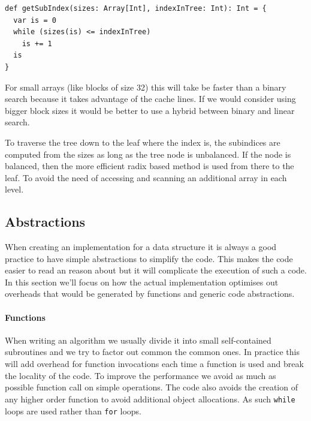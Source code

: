 \begin{lstlisting}[frame=single]
def getSubIndex(sizes: Array[Int], indexInTree: Int): Int = {
  var is = 0
  while (sizes(is) <= indexInTree)
    is += 1
  is
}
\end{lstlisting}

For small arrays (like blocks of size 32) this will take be faster than a binary search because it takes advantage of the cache lines. If we would consider using bigger block sizes it would be better to use a hybrid between binary and linear search.

To traverse the tree down to the leaf where the index is, the subindices are computed from the sizes as long as the tree node is unbalanced. If the node is balanced, then the more efficient radix based method is used from there to the leaf. To avoid the need of accessing and scanning an additional array in each level.



\subsection{Abstractions}
\label{sec:Abstractions}
When creating an implementation for a data structure it is always a good practice to have simple abstractions to simplify the code. This makes the code easier to read an reason about but it will complicate the execution of such a code. In this section we'll focus on how the actual implementation optimises out overheads that would be generated by functions and generic code abstractions.

\paragraph{Functions} When writing an algorithm we usually divide it into small self-contained subroutines and we try to factor out common the common ones. In practice this will add overhead for function invocations each time a function is used and break the locality of the code. To improve the performance we avoid as much as possible function call on simple operations. The code also avoids the creation of any higher order function to avoid additional object allocations. As such \texttt{while} loops are used rather than \texttt{for} loops.


